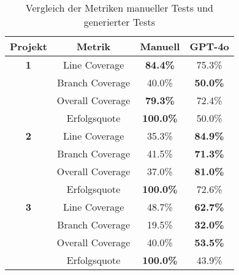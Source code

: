 \bgroup
\def\arraystretch{2}
\begin{table}[ht]
	\vspace{.5cm}
	\centering		
	\begin{center}
		\begin{tabular}{|c||c|c|c|}
			\hline 
			Projekt & Metrik & Manuell & GPT-4o \\
			\hline 
			\hline
			\textbf{1} & Line Coverage & \textbf{84.4\%} & 75.3\% \\
			\hline
			& Branch Coverage & 40.0\% & \textbf{50.0\%} \\
			\hline
			& Overall Coverage & \textbf{79.3\%} & 72.4\% \\
			\hline
			& Erfolgsquote & \textbf{100.0\%} & 50.0\% \\
			\hline
			\hline
			\textbf{2} & Line Coverage & 35.3\% & \textbf{84.9\%} \\
			\hline
			& Branch Coverage & 41.5\% & \textbf{71.3\%} \\
			\hline
			& Overall Coverage & 37.0\% & \textbf{81.0\%} \\
			\hline
			& Erfolgsquote & \textbf{100.0\%} & 72.6\%\\
			\hline
			\hline
			\textbf{3} & Line Coverage & 48.7\% & \textbf{62.7\%} \\
			\hline
			& Branch Coverage & 19.5\% & \textbf{32.0\%} \\
			\hline
			& Overall Coverage & 40.0\% & \textbf{53.5\%} \\
			\hline
			& Erfolgsquote & \textbf{100.0\%} & 43.9\% \\
			\hline
		\end{tabular} 
	\end{center}
	\caption{Vergleich der Metriken manueller Tests und generierter Tests}
	\label{fig:comp}
\end{table}
\egroup